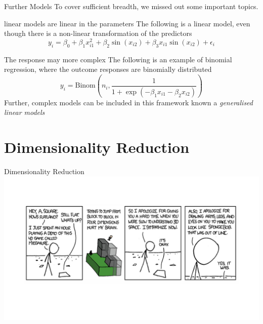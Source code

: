 \documentclass{bredelebeamer}
\begin{document}
\begin{frame}{Further Models}
To cover sufficient breadth, we missed out some important topics.
\begin{exampleblock}{linear models are linear in the parameters}
	The following is a linear model, even though there is a non-linear transformation of the predictors
\begin{equation}
	y_i = \beta_0 + \beta_1x_{i1}^2 + \beta_2 \sin(x_{i
2}) + \beta_3 x_{i1}\sin(x_{i2}) + \epsilon_i
\end{equation}
\end{exampleblock}
\begin{exampleblock}{The response may more complex}
	The following is an example of binomial regression, where the outcome responses
	are binomially distributed
	\begin{equation}
	y_i = \text{Binom}\left(n_i, \frac{1}{1 + \exp(- \beta_1x_{i1} - \beta_2x_{i2})}\right)
	\end{equation}
	Further, complex models can be included in this framework known a \textit{generalised linear models}
\end{exampleblock}

\end{frame}

\section{Dimensionality Reduction}

\begin{frame}{Dimensionality Reduction}
\includegraphics[width=1\textwidth]{dimreduce}
\end{frame}
\end{document}
